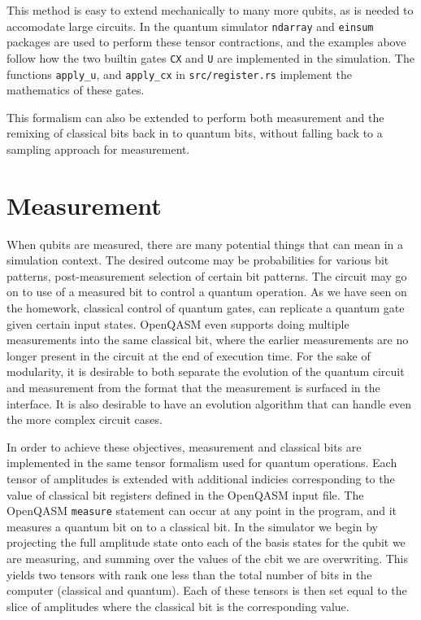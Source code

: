 \documentclass[%
 reprint,
 amsmath,amssymb,
 aps,
]{revtex4-2}
\begin{document}
This method is easy to extend mechanically to many more qubits, as is needed to accomodate large circuits. In the quantum simulator \texttt{ndarray} and \texttt{einsum} packages are used to perform these tensor contractions, and the examples above follow how the two builtin gates \texttt{CX} and \texttt{U} are implemented in the simulation. The functions \texttt{apply\_u}, and \texttt{apply\_cx} in \texttt{src/register.rs} implement the mathematics of these gates. 

This formalism can also be extended to perform both measurement and the remixing of classical bits back in to quantum bits, without falling back to a sampling approach for measurement.


\section{\label{sec:level1} Measurement}
When qubits are measured, there are many potential things that can mean in a simulation context. The desired outcome may be probabilities for various bit patterns, post-measurement selection of certain bit patterns. The circuit may go on to use of a measured bit to control a quantum operation. As we have seen on the homework, classical control of quantum gates, can replicate a quantum gate given certain input states. OpenQASM even supports doing multiple measurements into the same classical bit, where the earlier measurements are no longer present in the circuit at the end of execution time. For the sake of modularity, it is desirable to both separate the evolution of the quantum circuit and measurement from the format that the measurement is surfaced in the interface. It is also desirable to have an evolution algorithm that can handle even the more complex circuit cases.

In order to achieve these objectives, measurement and classical bits are implemented in the same tensor formalism used for quantum operations. Each tensor of amplitudes is extended with additional indicies corresponding to the value of classical bit registers defined in the OpenQASM input file. The OpenQASM \texttt{measure} statement can occur at any point in the program, and it measures a quantum bit on to a classical bit. In the simulator we begin by projecting the full amplitude state onto each of the basis states for the qubit we are measuring, and summing over the values of the cbit we are overwriting. This yields two tensors with rank one less than the total number of bits in the computer (classical and quantum). Each of these tensors is then set equal to the slice of amplitudes where the classical bit is the corresponding value.
\end{document}

